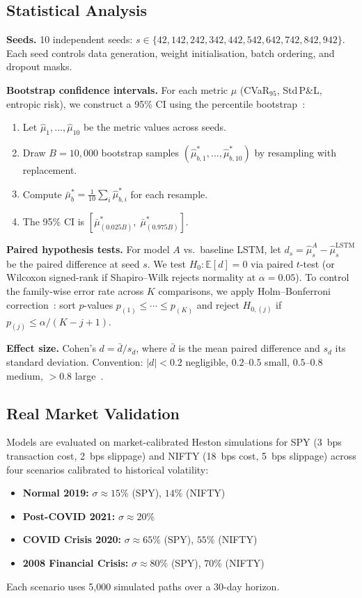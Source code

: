 \documentclass[11pt]{article}
\newcommand{\E}{\mathbb{E}}
\begin{document}
\subsection{Statistical Analysis}

\textbf{Seeds.} 10 independent seeds: $s \in \{42, 142, 242, 342, 442, 542, 642, 742, 842, 942\}$.  Each seed controls data generation, weight initialisation, batch ordering, and dropout masks.

\textbf{Bootstrap confidence intervals.}  For each metric $\mu$ (CVaR$_{95}$, Std\,P\&L, entropic risk), we construct a 95\% CI using the percentile bootstrap~\citep{efron1979bootstrap}:
\begin{enumerate}[noitemsep]
    \item Let $\hat\mu_1, \ldots, \hat\mu_{10}$ be the metric values across seeds.
    \item Draw $B = 10{,}000$ bootstrap samples $(\hat\mu^*_{b,1}, \ldots, \hat\mu^*_{b,10})$ by resampling with replacement.
    \item Compute $\bar\mu^*_b = \frac{1}{10}\sum_i \hat\mu^*_{b,i}$ for each resample.
    \item The 95\% CI is $[\bar\mu^*_{(0.025B)},\; \bar\mu^*_{(0.975B)}]$.
\end{enumerate}

\textbf{Paired hypothesis tests.}  For model $A$ vs.\ baseline LSTM, let $d_s = \hat\mu_s^A - \hat\mu_s^{\mathrm{LSTM}}$ be the paired difference at seed $s$.  We test $H_0: \E[d] = 0$ via paired $t$-test (or Wilcoxon signed-rank if Shapiro--Wilk rejects normality at $\alpha = 0.05$).  To control the family-wise error rate across $K$ comparisons, we apply Holm--Bonferroni correction~\citep{holm1979simple}: sort $p$-values $p_{(1)} \le \cdots \le p_{(K)}$ and reject $H_{0,(j)}$ if $p_{(j)} \le \alpha/(K - j + 1)$.

\textbf{Effect size.}  Cohen's $d = \bar{d} / s_d$, where $\bar{d}$ is the mean paired difference and $s_d$ its standard deviation.  Convention: $|d| < 0.2$ negligible, $0.2$--$0.5$ small, $0.5$--$0.8$ medium, $> 0.8$ large~\citep{cohen1988statistical}.

\subsection{Real Market Validation}

Models are evaluated on market-calibrated Heston simulations for SPY (3~bps transaction cost, 2~bps slippage) and NIFTY (18~bps cost, 5~bps slippage) across four scenarios calibrated to historical volatility:
\begin{itemize}[noitemsep]
    \item \textbf{Normal 2019:} $\sigma \approx 15\%$ (SPY), $14\%$ (NIFTY)
    \item \textbf{Post-COVID 2021:} $\sigma \approx 20\%$
    \item \textbf{COVID Crisis 2020:} $\sigma \approx 65\%$ (SPY), $55\%$ (NIFTY)
    \item \textbf{2008 Financial Crisis:} $\sigma \approx 80\%$ (SPY), $70\%$ (NIFTY)
\end{itemize}
Each scenario uses 5,000 simulated paths over a 30-day horizon.
\end{document}
